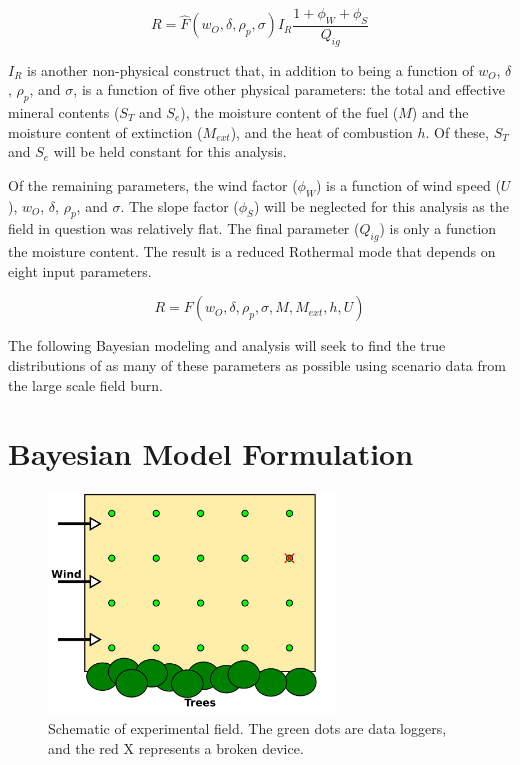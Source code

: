 \documentclass[11pt]{article}
\begin{document}
\begin{equation}
R = \hat{F}(w_O, \delta, \rho_p, \sigma) I_R\frac{1+\phi_W+\phi_S}{Q_{ig}}
\label{eq:roth_fun2}
\end{equation}

$I_R$ is another non-physical construct that, in addition to being a function of $w_O$, $\delta$, $\rho_p$, and $\sigma$, is a function of five other physical parameters: the total and effective mineral contents ($S_T$ and $S_e$), the moisture content of the fuel ($M$) and the moisture content of extinction ($M_{ext}$), and the heat of combustion $h$. Of these, $S_T$ and $S_e$ will be held constant for this analysis.

Of the remaining parameters, the wind factor ($\phi_W$) is a function of wind speed ($U$), $w_O$, $\delta$, $\rho_p$, and $\sigma$. The slope factor ($\phi_S$) will be neglected for this analysis as the field in question was relatively flat. The final parameter ($Q_{ig}$) is only a function the moisture content. The result is a reduced Rothermal mode that depends on eight input parameters.

\begin{equation}
R = F(w_O, \delta, \rho_p, \sigma, M, M_{ext}, h, U)
\label{eq:roth_fun3}
\end{equation}

The following Bayesian modeling and analysis will seek to find the true distributions of as many of these parameters as possible using scenario data from the large scale field burn.

\section{Bayesian Model Formulation}

\begin{figure}[h]
\begin{center}
\includegraphics[width=3.0in]{./Figures/field}
\end{center}
\caption{Schematic of experimental field. The green dots are data loggers, and the red X represents a broken device.}
\label{fig:field} 
\end{figure}
\end{document}
